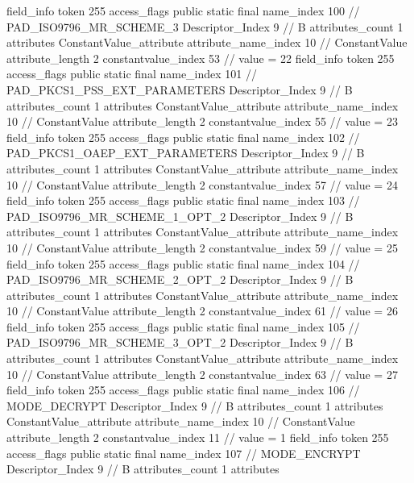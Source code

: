{{{{{{{				}
				}
			}
			field_info {
				token	255
				access_flags	public static final
				name_index	100		// PAD_ISO9796_MR_SCHEME_3
				Descriptor_Index	9		// B
				attributes_count	1
				attributes {
				ConstantValue_attribute {
					attribute_name_index	10		// ConstantValue
					attribute_length	2
					constantvalue_index	53		// value = 22
				}
				}
			}
			field_info {
				token	255
				access_flags	public static final
				name_index	101		// PAD_PKCS1_PSS_EXT_PARAMETERS
				Descriptor_Index	9		// B
				attributes_count	1
				attributes {
				ConstantValue_attribute {
					attribute_name_index	10		// ConstantValue
					attribute_length	2
					constantvalue_index	55		// value = 23
				}
				}
			}
			field_info {
				token	255
				access_flags	public static final
				name_index	102		// PAD_PKCS1_OAEP_EXT_PARAMETERS
				Descriptor_Index	9		// B
				attributes_count	1
				attributes {
				ConstantValue_attribute {
					attribute_name_index	10		// ConstantValue
					attribute_length	2
					constantvalue_index	57		// value = 24
				}
				}
			}
			field_info {
				token	255
				access_flags	public static final
				name_index	103		// PAD_ISO9796_MR_SCHEME_1_OPT_2
				Descriptor_Index	9		// B
				attributes_count	1
				attributes {
				ConstantValue_attribute {
					attribute_name_index	10		// ConstantValue
					attribute_length	2
					constantvalue_index	59		// value = 25
				}
				}
			}
			field_info {
				token	255
				access_flags	public static final
				name_index	104		// PAD_ISO9796_MR_SCHEME_2_OPT_2
				Descriptor_Index	9		// B
				attributes_count	1
				attributes {
				ConstantValue_attribute {
					attribute_name_index	10		// ConstantValue
					attribute_length	2
					constantvalue_index	61		// value = 26
				}
				}
			}
			field_info {
				token	255
				access_flags	public static final
				name_index	105		// PAD_ISO9796_MR_SCHEME_3_OPT_2
				Descriptor_Index	9		// B
				attributes_count	1
				attributes {
				ConstantValue_attribute {
					attribute_name_index	10		// ConstantValue
					attribute_length	2
					constantvalue_index	63		// value = 27
				}
				}
			}
			field_info {
				token	255
				access_flags	public static final
				name_index	106		// MODE_DECRYPT
				Descriptor_Index	9		// B
				attributes_count	1
				attributes {
				ConstantValue_attribute {
					attribute_name_index	10		// ConstantValue
					attribute_length	2
					constantvalue_index	11		// value = 1
				}
				}
			}
			field_info {
				token	255
				access_flags	public static final
				name_index	107		// MODE_ENCRYPT
				Descriptor_Index	9		// B
				attributes_count	1
				attributes {
}}}}}}
